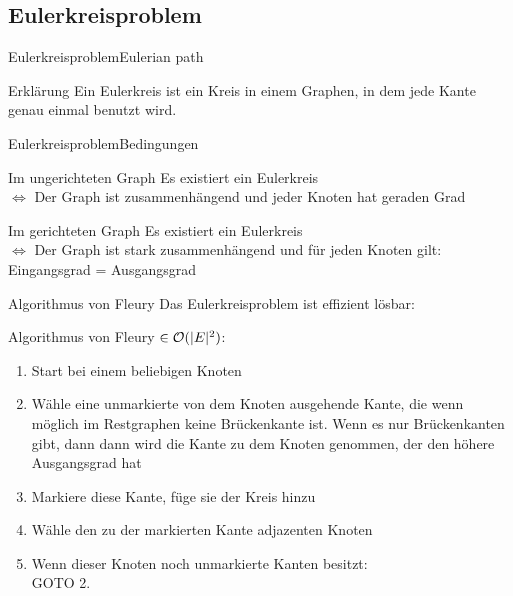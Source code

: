 \subsection{Eulerkreisproblem}

\begin{frame}{Eulerkreisproblem}{Eulerian path}
	\begin{block}{Erklärung}
		Ein Eulerkreis ist ein Kreis in einem Graphen, in dem jede Kante genau einmal benutzt wird.
	\end{block}
\end{frame}

\begin{frame}{Eulerkreisproblem}{Bedingungen}
	\begin{block}{Im ungerichteten Graph}
		Es existiert ein Eulerkreis\\
		$\Leftrightarrow$ Der Graph ist zusammenhängend und jeder Knoten hat geraden Grad
	\end{block}

	\begin{block}{Im gerichteten Graph}
		Es existiert ein Eulerkreis\\
		$\Leftrightarrow$ Der Graph ist stark zusammenhängend und für jeden Knoten gilt: Eingangsgrad = Ausgangsgrad
	\end{block}
\end{frame}

\begin{frame}{Algorithmus von Fleury}
	Das Eulerkreisproblem ist effizient lösbar:

	Algorithmus von Fleury $\in {\cal O}(|E|^2) $:

	\begin{enumerate}
		\item Start bei einem beliebigen Knoten
		\item Wähle eine unmarkierte von dem Knoten ausgehende Kante, die wenn möglich im Restgraphen keine Brückenkante ist. Wenn es nur Brückenkanten gibt, dann dann wird die Kante zu dem Knoten genommen, der den höhere Ausgangsgrad hat
		\item Markiere diese Kante, füge sie der Kreis hinzu
		\item Wähle den zu der markierten Kante adjazenten Knoten
		\item Wenn dieser Knoten noch unmarkierte Kanten besitzt: \\GOTO 2.
	\end{enumerate}
\end{frame}

